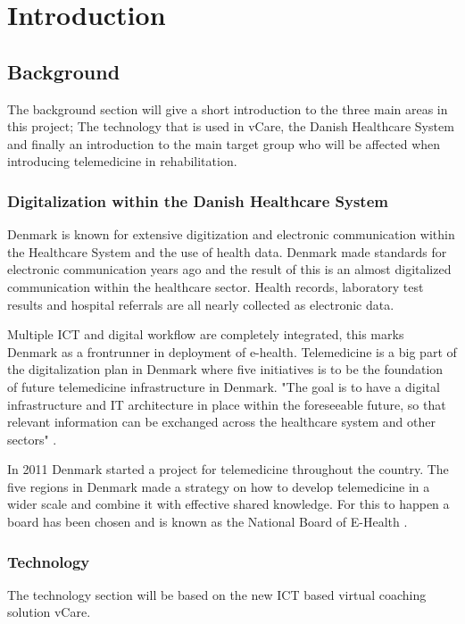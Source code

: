 \chapter{Introduction}

\section{Background}
The background section will give a short introduction to the three main areas in this project; The technology that is used in vCare, the Danish Healthcare System and finally an introduction to the main target group who will be affected when introducing telemedicine in rehabilitation. 

\subsection{Digitalization within the Danish Healthcare System}

Denmark is known for extensive digitization and electronic communication within the Healthcare System and the use of health data. Denmark made standards for electronic communication years ago and the result of this is an almost digitalized communication within the healthcare sector. Health records, laboratory test results and hospital referrals are all nearly collected as electronic data. 

Multiple ICT and digital workflow are completely integrated, this marks Denmark as a frontrunner in deployment of e-health. Telemedicine is a big part of the digitalization plan in Denmark where five initiatives is to be the foundation of future telemedicine infrastructure in Denmark. "The goal is to have a digital infrastructure and IT architecture in place within the foreseeable future, so that relevant information can be exchanged across the healthcare system and other sectors" \cite{Healthcareindk2}.

In 2011 Denmark started a project for telemedicine throughout the country. The five regions in Denmark made a strategy on how to develop telemedicine in a wider scale and combine it with effective shared knowledge. For this to happen a board has been chosen and is known as the National Board of E-Health \cite{DKhealthreview}. 

\subsection{Technology}

The technology section will be based on the new ICT based virtual coaching solution vCare. 

